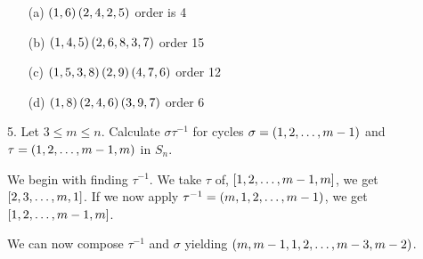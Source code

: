 \begin{mdframed}[style=darkAnswer,frametitle={Joe Starr}]
  \begin{itemize}
    \item [(a)] {
          $\left(1,6\right)\left(2,4,2,5\right)$
          order is 4
          }
    \item [(b)] {
          $\left(1,4,5\right)\left(2,6,8,3,7\right)$
          order 15
          }
    \item [(c)] {
          $\left(1,5,3,8\right)\left(2,9\right)\left(4,7,6\right)$
          order 12
          }
    \item [(d)] {
          $\left(1,8\right)\left(2,4,6\right)\left(3,9,7\right)$
          order 6
          }
  \end{itemize}
\end{mdframed}
\newpage
\begin{mdframed}[style=darkQuesion]
  5. Let $3\leq m\leq n$. Calculate $\sigma\tau^{-1}$ for cycles
  $\sigma= \left(1,2,\dots , m-1\right)$ and \\ $\tau= \left(1,2,\dots,m-1,m\right)$ in $S_n$.
\end{mdframed}

\begin{mdframed}[style=darkAnswer,frametitle={Joe Starr}]
  We begin with finding $\tau^{-1}$. We take $\tau$ of, $\left[1,2,\dots,m-1,m\right]$,
  we get $\left[2,3,\dots,m,1\right]$. If we now apply 
  $\tau^{-1}=\left(m,1,2,\dots, m-1\right)$, we get $\left[1,2,\dots,m-1,m\right]$. 

  We can now compose $\tau^{-1}$ and $\sigma$ yielding 
  $\left(m,m-1,1,2,\dots,m-3,m-2\right)$.
\end{mdframed}
\newpage
